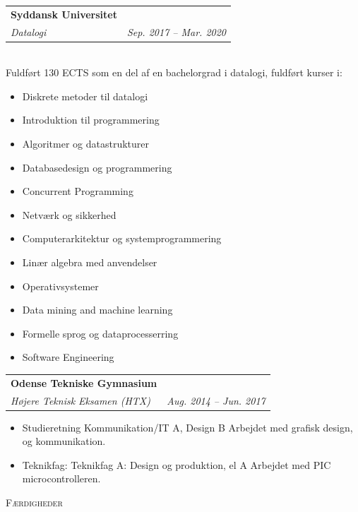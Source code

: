 \documentclass[11pt]{article}
\makeatletter
\newcommand{\resumeSubheading}[4]{
  \noindent\begin{tabular*}{0.98\textwidth}[t]{l@{\extracolsep{\fill}}r}
    \noindent \textbf{#1} & #2 \\ \vspace{-3pt} 
    \noindent \textit{\small#3} & \textit{\small #4} 
  \end{tabular*}\vspace{7pt}
}
\makeatother
\begin{document}
\resumeSubheading{Syddansk Universitet}{}{Datalogi}{Sep. 2017
-- Mar. 2020}\\\vspace{0.25cm} 
{\indent\small Fuldført 130 ECTS som en del af en bachelorgrad i datalogi,
fuldført kurser i:}
  \vspace{-0.3cm}
  {\footnotesize 
  \begin{itemize}
  \setlength{\itemsep}{-1pt}
    \item Diskrete metoder til datalogi
    \item Introduktion til programmering
    \item Algoritmer og datastrukturer
    \item Databasedesign og programmering
    \item Concurrent Programming
    \item Netværk og sikkerhed
    \item Computerarkitektur og systemprogrammering
    \item Linær algebra med anvendelser
    \item Operativsystemer 
    \item Data mining and machine learning
    \item Formelle sprog og dataprocesserring 
    \item Software Engineering
\end{itemize}}
\vspace{0.3cm}

\resumeSubheading{Odense Tekniske Gymnasium}{}{Højere Teknisk Eksamen (HTX)}{Aug. 2014 -- Jun. 2017}
{\small \begin{itemize}\vspace{-0.25cm}
  \setlength{\itemsep}{-1pt}
  \item Studieretning Kommunikation/IT A, Design B
    \subitem Arbejdet med grafisk design, og kommunikation.
  \item Teknikfag: Teknikfag A: Design og produktion, el A
    \subitem\footnotesize Arbejdet med PIC microcontrolleren.
\end{itemize}
} \vspace{0.5cm}

\noindent\large{\scshape{Færdigheder}} \newline
\noindent{\rule[0.3cm]{\textwidth}{0.4pt}}
\end{document}
